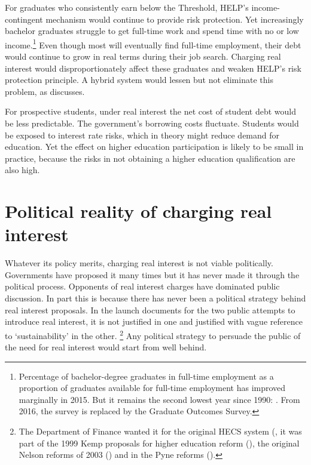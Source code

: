 \documentclass[embargoed]{grattan}
\begin{document}
For graduates who consistently earn below the \gls{Threshold}, \gls{HELP}'s income-contingent mechanism would continue to provide risk protection.
Yet increasingly bachelor graduates struggle to get full-time work and spend time with no or low income.\footnote{Percentage of bachelor-degree graduates in full-time employment as a proportion of graduates available for full-time employment has improved marginally in 2015.
But it remains the second lowest year since 1990: \textcite{GCAvariousyearsGradStatsemploymentsalary}.
From 2016, the survey is replaced by the Graduate Outcomes Survey.} Even though most will eventually find full-time employment, their debt would continue to grow in real terms during their job search.
Charging real interest would disproportionately affect these graduates and weaken \gls{HELP}'s risk protection principle.
A hybrid system would lessen but not eliminate this problem, as  discusses.

For prospective students, under real interest the net cost of student debt would be less predictable.
The government's borrowing costs fluctuate.
Students would be exposed to interest rate risks, which in theory might reduce demand for education.
Yet the effect on higher education participation is likely to be small in practice, because the risks in not obtaining a higher education qualification are also high.

\section{Political reality of charging real interest}\label{political-reality-of-charging-real-interest}

Whatever its policy merits, charging real interest is not viable politically.
Governments have proposed it many times but it has never made it through the political process.
Opponents of real interest charges have dominated public discussion.
In part this is because there has never been a political strategy behind real interest proposals.
In the launch documents for the two public attempts to introduce real interest, it is not justified in one and justified with vague reference to `sustainability' in the other.%
\footnote{The Department of Finance wanted it for the original \gls{HECS} system (\textcite{Archives19882015Cabinetsubmission5922}, it was part of the 1999 Kemp proposals for higher education reform (\textcite{Kemp2001Appendix4Leaked}), the original Nelson reforms of 2003 (\textcite{Nelson2003OuruniversitiesBacking}) and in the Pyne reforms (\textcite{Education2014Portfoliobudgetstatements}).} 
Any political strategy to persuade the public of the need for real interest would start from well behind.
\end{document}
